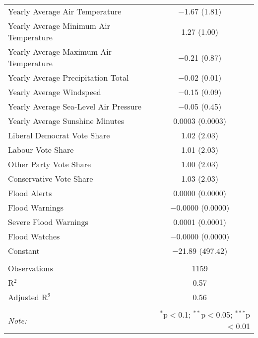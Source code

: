 \documentclass[12pt,letterpaper]{article}
\begin{document}
\begin{table}[!htbp]
\begin{tabular}{@{\extracolsep{5pt}}lc}
		Yearly Average Air Temperature & $-$1.67 (1.81) \\ 
		Yearly Average Minimum Air Temperature & 1.27 (1.00) \\ 
		Yearly Average Maximum Air Temperature & $-$0.21 (0.87) \\ 
		Yearly Average Precipitation Total & $-$0.02 (0.01) \\ 
		Yearly Average Windspeed & $-$0.15 (0.09) \\ 
		Yearly Average  Sea-Level Air Pressure & $-$0.05 (0.45) \\ 
		Yearly Average Sunshine Minutes & 0.0003 (0.0003) \\ 
		Liberal Democrat Vote Share & 1.02 (2.03) \\ 
		Labour Vote Share & 1.01 (2.03) \\ 
		Other Party Vote Share & 1.00 (2.03) \\ 
		Conservative Vote Share & 1.03 (2.03) \\ 
		Flood Alerts & 0.0000 (0.0000) \\ 
		Flood Warnings & $-$0.0000 (0.0000) \\ 
		Severe Flood Warnings & 0.0001 (0.0001) \\ 
		Flood Watches & $-$0.0000 (0.0000) \\ 
		Constant & $-$21.89 (497.42) \\ 
		\hline \\[-1.8ex] 
		Observations & 1159 \\ 
		R$^{2}$ & 0.57 \\ 
		Adjusted R$^{2}$ & 0.56 \\ 
		\hline 
		\hline \\[-1.8ex] 
		\textit{Note:}  & \multicolumn{1}{r}{$^{*}$p$<$0.1; $^{**}$p$<$0.05; $^{***}$p$<$0.01} \\ 
	\end{tabular} 
\end{table} 







\end{document}

